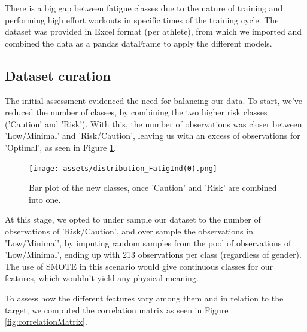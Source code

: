 \documentclass[conference]{IEEEtran}
\begin{document}
There is a big gap between fatigue classes due to the nature of training and performing high effort workouts in specific times of the training cycle. The dataset was provided in Excel format (per athlete), from which we imported and combined the data as a pandas dataFrame to apply the different models.



\subsection{Dataset curation}

The initial assessment evidenced the need for balancing our data. To start, we've reduced the number of classes, by combining the two higher risk classes ('Caution' and 'Risk'). With this, the number of observations was closer between 'Low/Minimal' and 'Risk/Caution', leaving us with an excess of observations for 'Optimal', as seen in Figure \ref{histClasses}. 

\begin{figure}[H]
    \centering
    \texttt{[image: assets/distribution\_FatigInd(0).png]}
    \caption{Bar plot of the new classes, once 'Caution' and 'Risk' are combined into one.}
    \label{histClasses}
\end{figure}

At this stage, we opted to under sample our dataset to the number of observations of 'Risk/Caution', and over sample the observations in 'Low/Minimal', by imputing random samples from the pool of observations of 'Low/Minimal', ending up with 213 observations per class (regardless of gender). The use of SMOTE in this scenario would give continuous classes for our features, which wouldn't yield any physical meaning.

To assess how the different features vary among them and in relation to the target, we computed the correlation matrix as seen in Figure \ref{fig:correlationMatrix}.
\end{document}
